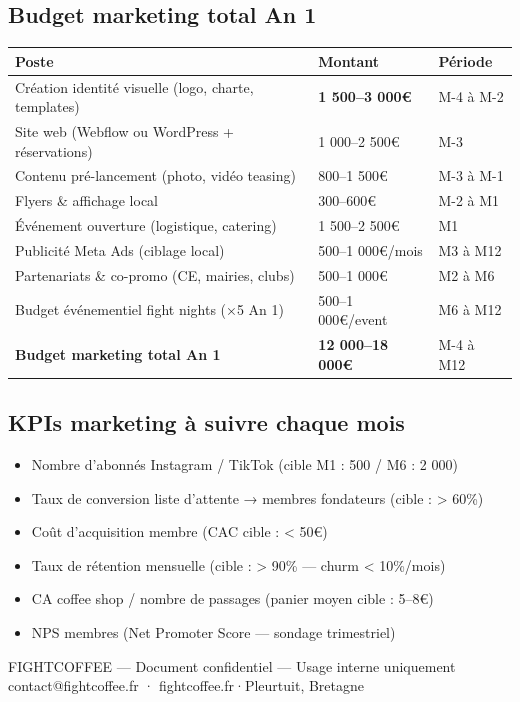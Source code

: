 \documentclass[11pt, a4paper]{article}
\newcommand{\redcell}[1]{\textcolor{fc-red}{\textbf{#1}}}
\begin{document}
\subsection{Budget marketing total An 1}

\begin{center}
\begin{tabular}{@{}p{8cm}p{3cm}p{2.5cm}@{}}
\toprule
\rowcolor{fc-ink}\color{white}\textbf{Poste} & \color{white}\textbf{Montant} & \color{white}\textbf{Période} \\
\midrule
Création identité visuelle (logo, charte, templates) & \redcell{1 500–3 000€} & M-4 à M-2 \\
\rowcolor{fc-bg2} Site web (Webflow ou WordPress + réservations) & 1 000–2 500€ & M-3 \\
Contenu pré-lancement (photo, vidéo teasing) & 800–1 500€ & M-3 à M-1 \\
\rowcolor{fc-bg2} Flyers \& affichage local & 300–600€ & M-2 à M1 \\
Événement ouverture (logistique, catering) & 1 500–2 500€ & M1 \\
\rowcolor{fc-bg2} Publicité Meta Ads (ciblage local) & 500–1 000€/mois & M3 à M12 \\
Partenariats \& co-promo (CE, mairies, clubs) & 500–1 000€ & M2 à M6 \\
\rowcolor{fc-bg2} Budget événementiel fight nights (×5 An 1) & 500–1 000€/event & M6 à M12 \\
\midrule
\textbf{Budget marketing total An 1} & \textbf{12 000–18 000€} & M-4 à M12 \\
\bottomrule
\end{tabular}
\end{center}

\subsection{KPIs marketing à suivre chaque mois}

\begin{itemize}
  \item Nombre d'abonnés Instagram / TikTok (cible M1 : 500 / M6 : 2 000)
  \item Taux de conversion liste d'attente → membres fondateurs (cible : > 60\%)
  \item Coût d'acquisition membre (CAC cible : < 50€)
  \item Taux de rétention mensuelle (cible : > 90\% — churm < 10\%/mois)
  \item CA coffee shop / nombre de passages (panier moyen cible : 5–8€)
  \item NPS membres (Net Promoter Score — sondage trimestriel)
\end{itemize}

\vspace{16pt}
\begin{center}
\small\color{fc-ink3} FIGHTCOFFEE — Document confidentiel — Usage interne uniquement\\
\color{fc-red} contact@fightcoffee.fr · fightcoffee.fr\quad\color{fc-ink3}·\quad Pleurtuit, Bretagne
\end{center}
\end{document}
